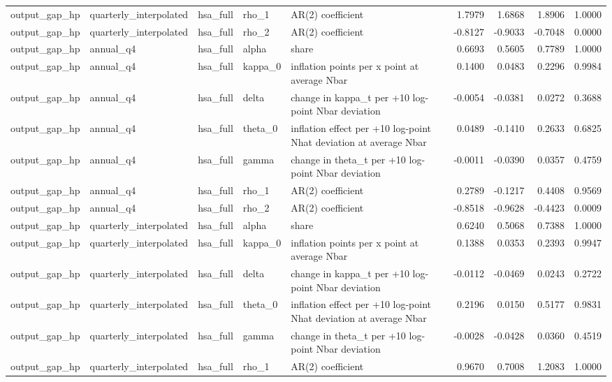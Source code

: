 \begin{tabular}{lllllrrrr}
output\_gap\_hp & quarterly\_interpolated & hsa\_full & rho\_1 & AR(2) coefficient & 1.7979 & 1.6868 & 1.8906 & 1.0000 \\
output\_gap\_hp & quarterly\_interpolated & hsa\_full & rho\_2 & AR(2) coefficient & -0.8127 & -0.9033 & -0.7048 & 0.0000 \\
output\_gap\_hp & annual\_q4 & hsa\_full & alpha & share & 0.6693 & 0.5605 & 0.7789 & 1.0000 \\
output\_gap\_hp & annual\_q4 & hsa\_full & kappa\_0 & inflation points per x point at average Nbar & 0.1400 & 0.0483 & 0.2296 & 0.9984 \\
output\_gap\_hp & annual\_q4 & hsa\_full & delta & change in kappa\_t per +10 log-point Nbar deviation & -0.0054 & -0.0381 & 0.0272 & 0.3688 \\
output\_gap\_hp & annual\_q4 & hsa\_full & theta\_0 & inflation effect per +10 log-point Nhat deviation at average Nbar & 0.0489 & -0.1410 & 0.2633 & 0.6825 \\
output\_gap\_hp & annual\_q4 & hsa\_full & gamma & change in theta\_t per +10 log-point Nbar deviation & -0.0011 & -0.0390 & 0.0357 & 0.4759 \\
output\_gap\_hp & annual\_q4 & hsa\_full & rho\_1 & AR(2) coefficient & 0.2789 & -0.1217 & 0.4408 & 0.9569 \\
output\_gap\_hp & annual\_q4 & hsa\_full & rho\_2 & AR(2) coefficient & -0.8518 & -0.9628 & -0.4423 & 0.0009 \\
output\_gap\_hp & quarterly\_interpolated & hsa\_full & alpha & share & 0.6240 & 0.5068 & 0.7388 & 1.0000 \\
output\_gap\_hp & quarterly\_interpolated & hsa\_full & kappa\_0 & inflation points per x point at average Nbar & 0.1388 & 0.0353 & 0.2393 & 0.9947 \\
output\_gap\_hp & quarterly\_interpolated & hsa\_full & delta & change in kappa\_t per +10 log-point Nbar deviation & -0.0112 & -0.0469 & 0.0243 & 0.2722 \\
output\_gap\_hp & quarterly\_interpolated & hsa\_full & theta\_0 & inflation effect per +10 log-point Nhat deviation at average Nbar & 0.2196 & 0.0150 & 0.5177 & 0.9831 \\
output\_gap\_hp & quarterly\_interpolated & hsa\_full & gamma & change in theta\_t per +10 log-point Nbar deviation & -0.0028 & -0.0428 & 0.0360 & 0.4519 \\
output\_gap\_hp & quarterly\_interpolated & hsa\_full & rho\_1 & AR(2) coefficient & 0.9670 & 0.7008 & 1.2083 & 1.0000 \\

\end{tabular}
